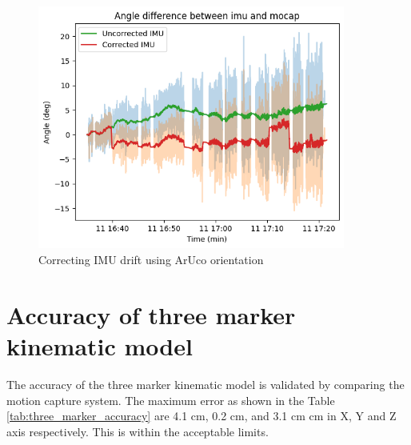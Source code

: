 \documentclass[12pt, twoside]{report}
\begin{document}
\begin{figure}
    \centering
    \includegraphics[width=0.9\textwidth]{m_imu_drift_correction.png}
    \caption{Correcting IMU drift using ArUco orientation}
    \label{fig:imu_correction}
\end{figure}

\section{Accuracy of three marker kinematic model}

The accuracy of the three marker kinematic model is validated by comparing the
motion capture system. The maximum error as shown in the Table \ref{tab:three_marker_accuracy}
are 4.1 cm, 0.2 cm, and 3.1 cm cm in X, Y and Z axis respectively. This is
within the acceptable limits.
\end{document}
